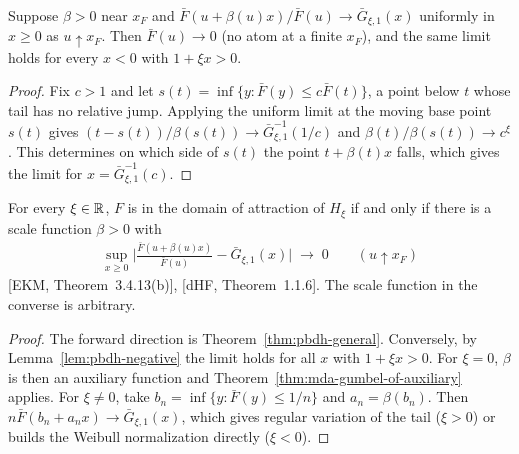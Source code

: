 \begin{lemma}
  \label{lem:pbdh-negative}
  \leanok
  Suppose $\beta > 0$ near $x_F$ and $\bar F(u + \beta(u) x)/\bar F(u) \to \bar G_{\xi,1}(x)$
  uniformly in $x \ge 0$ as $u \uparrow x_F$. Then $\bar F(u) \to 0$ (no atom at a finite $x_F$),
  and the same limit holds for every $x < 0$ with $1 + \xi x > 0$.
\end{lemma}
\begin{proof}
  \leanok
  Fix $c > 1$ and let $s(t) = \inf\{y : \bar F(y) \le c \bar F(t)\}$, a point below $t$ whose
  tail has no relative jump. Applying the uniform limit at the moving base point $s(t)$ gives
  $(t - s(t))/\beta(s(t)) \to \bar G_{\xi,1}^{-1}(1/c)$ and $\beta(t)/\beta(s(t)) \to c^\xi$.
  This determines on which side of $s(t)$ the point $t + \beta(t) x$ falls, which gives the
  limit for $x = \bar G_{\xi,1}^{-1}(c)$.
\end{proof}

\begin{theorem}
  \label{thm:pbdh-iff}
  \leanok
  For every $\xi \in \mathbb{R}$, $F$ is in the domain of attraction of $H_\xi$ if and only if there is
  a scale function $\beta > 0$ with
  \begin{align*}
    \sup_{x \ge 0} \Big| \frac{\bar F(u + \beta(u) x)}{\bar F(u)} - \bar G_{\xi,1}(x) \Big|
      \; \to \; 0 \qquad (u \uparrow x_F)
  \end{align*}
  [EKM, Theorem~3.4.13(b)], [dHF, Theorem~1.1.6]. The scale function in the converse is
  arbitrary.
\end{theorem}
\begin{proof}
  \leanok
  The forward direction is Theorem~\ref{thm:pbdh-general}. Conversely, by
  Lemma~\ref{lem:pbdh-negative} the limit holds for all $x$ with $1 + \xi x > 0$. For $\xi = 0$,
  $\beta$ is then an auxiliary function and Theorem~\ref{thm:mda-gumbel-of-auxiliary} applies.
  For $\xi \ne 0$, take $b_n = \inf\{y : \bar F(y) \le 1/n\}$ and $a_n = \beta(b_n)$. Then
  $n \bar F(b_n + a_n x) \to \bar G_{\xi,1}(x)$, which gives regular variation of the tail
  ($\xi > 0$) or builds the Weibull normalization directly ($\xi < 0$).
\end{proof}
